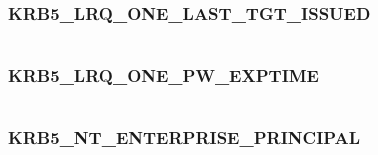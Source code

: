 \documentclass[letterpaper,10pt,english]{sphinxmanual}
\begin{document}
\subsubsection{KRB5\_LRQ\_ONE\_LAST\_TGT\_ISSUED}
\label{appdev/refs/macros/KRB5_LRQ_ONE_LAST_TGT_ISSUED:krb5-lrq-one-last-tgt-issued}\label{appdev/refs/macros/KRB5_LRQ_ONE_LAST_TGT_ISSUED:krb5-lrq-one-last-tgt-issued-data}\label{appdev/refs/macros/KRB5_LRQ_ONE_LAST_TGT_ISSUED::doc}

\begin{fulllineitems}
\label{appdev/refs/macros/KRB5_LRQ_ONE_LAST_TGT_ISSUED:KRB5_LRQ_ONE_LAST_TGT_ISSUED}
\end{fulllineitems}


\begin{tabulary}{\linewidth}{|L|L|}
\hline

 & 
\\
\hline\end{tabulary}



\subsubsection{KRB5\_LRQ\_ONE\_PW\_EXPTIME}
\label{appdev/refs/macros/KRB5_LRQ_ONE_PW_EXPTIME:krb5-lrq-one-pw-exptime}\label{appdev/refs/macros/KRB5_LRQ_ONE_PW_EXPTIME:krb5-lrq-one-pw-exptime-data}\label{appdev/refs/macros/KRB5_LRQ_ONE_PW_EXPTIME::doc}

\begin{fulllineitems}
\label{appdev/refs/macros/KRB5_LRQ_ONE_PW_EXPTIME:KRB5_LRQ_ONE_PW_EXPTIME}
\end{fulllineitems}


\begin{tabulary}{\linewidth}{|L|L|}
\hline

 & 
\\
\hline\end{tabulary}



\subsubsection{KRB5\_NT\_ENTERPRISE\_PRINCIPAL}
\label{appdev/refs/macros/KRB5_NT_ENTERPRISE_PRINCIPAL:krb5-nt-enterprise-principal-data}\label{appdev/refs/macros/KRB5_NT_ENTERPRISE_PRINCIPAL:krb5-nt-enterprise-principal}\label{appdev/refs/macros/KRB5_NT_ENTERPRISE_PRINCIPAL::doc}
\end{document}
